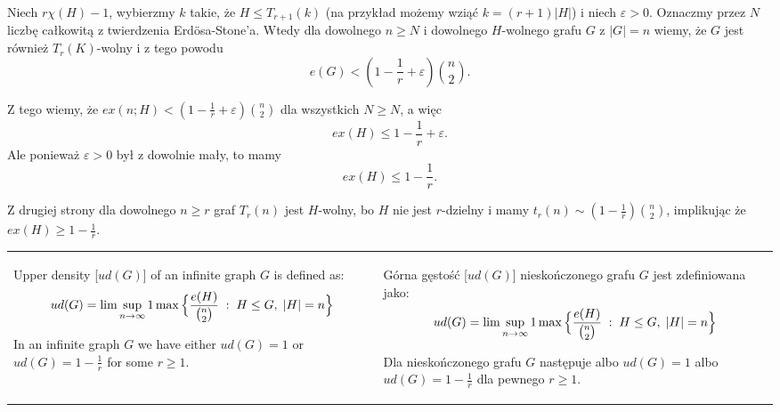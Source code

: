 Niech $r\chi(H)-1$, wybierzmy $k$ takie, że $H\leq T_{r+1}(k)$ (na przykład możemy wziąć $k=(r+1)|H|$) i niech $\varepsilon>0$. Oznaczmy przez $N$ liczbę całkowitą z twierdzenia Erd\"osa-Stone'a. Wtedy dla dowolnego $n\geq N$ i dowolnego $H$-wolnego grafu $G$ z $|G|=n$ wiemy, że $G$ jest również $T_r(K)$-wolny i z tego powodu
$$e(G)<(1-\frac1r+\varepsilon){n\choose 2}.$$

Z tego wiemy, że $ex(n;H)<(1-\frac1r+\varepsilon){n\choose 2}$ dla wszystkich $N\geq N$, a więc
$$ex(H)\leq 1-\frac1r+\varepsilon.$$
Ale ponieważ $\varepsilon>0$ był z dowolnie mały, to mamy
$$ex(H)\leq 1-\frac1r.$$

Z drugiej strony dla dowolnego $n\geq r$ graf $T_r(n)$ jest $H$-wolny, bo $H$ nie jest $r$-dzielny i mamy $t_r(n)\sim (1-\frac1r){n\choose 2}$, implikując że $ex(H)\geq 1-\frac1r$.
\medskip

\medskip


\begin{tabularx}{\textwidth}{ X!{\color{git90gray}\vrule} X }

    {\color{def}Upper density} [$ud(G)$] of an infinite graph $G$ is defined as:
    $$ud(G)=\lim\sup\limits_{n\to\infty}1\max\Big\{{e(H)\over{n\choose2}}\;:\;H\leq G,\;|H|=n\Big\}$$

    In an infinite graph $G$ we have either $ud(G)=1$ or $ud(G)=1-\frac1r$ for some $r\geq1$.

    &

    {\color{def}Górna gęstość} [$ud(G)$] nieskończonego grafu $G$ jest zdefiniowana jako:
    $$ud(G)=\lim\sup\limits_{n\to\infty}1\max\Big\{{e(H)\over{n\choose2}}\;:\;H\leq G,\;|H|=n\Big\}$$

    Dla nieskończonego grafu $G$ następuje albo $ud(G)=1$ albo $ud(G)=1-\frac1r$ dla pewnego $r\geq1$.

\end{tabularx}